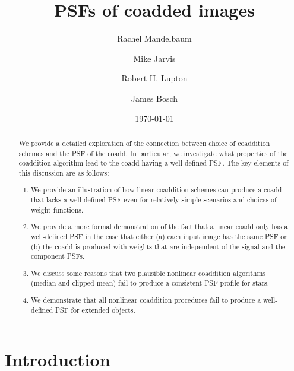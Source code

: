 \documentclass[modern]{style_and_logos/lsstdescnote}
\begin{document}
\title{PSFs of coadded images}
\author[0000-0003-2271-1527]{Rachel Mandelbaum}
\author[0000-0002-4179-5175]{Mike Jarvis}
\author[0000-0003-1666-0962]{Robert H. Lupton}
\author[0000-0003-2759-5764]{James Bosch}

\date{\today}

\begin{abstract}
    We provide a detailed exploration of the connection between choice of coaddition schemes and the PSF of the coadd.  In particular, we investigate what properties of the coaddition algorithm lead to the coadd having a well-defined PSF.  The key elements of this discussion are as follows: 
    \begin{enumerate}
        \item We provide an illustration of how linear coaddition schemes can produce a coadd that lacks a well-defined PSF even for relatively simple scenarios and choices of weight functions.  
        \item We provide a more formal demonstration of the fact that a linear coadd only has a well-defined PSF in the case that either (a) each input image has the same PSF or (b) the coadd is produced with weights that are independent of the signal and the component PSFs.
        \item We discuss some reasons that two plausible nonlinear coaddition algorithms (median and clipped-mean) fail to produce a consistent PSF profile for stars.
        \item We demonstrate that all nonlinear coaddition procedures fail to produce a well-defined PSF for extended objects.
    \end{enumerate}
\end{abstract}
\maketitle

\section{Introduction}\label{sec:intro}
\end{document}
